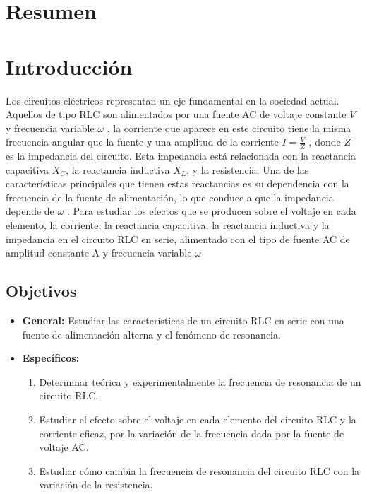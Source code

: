 \documentclass[spanish,notitlepage,letterpaper, 12pt]{article}
\begin{document}

\tableofcontents

\newpage

\section{Resumen}
\section{Introducción}
Los circuitos eléctricos representan un eje fundamental en la sociedad actual. Aquellos de tipo RLC son alimentados por una
fuente AC de voltaje constante $V$ y frecuencia variable $\omega$ , la corriente que
aparece en este circuito tiene la misma frecuencia angular que la fuente y una
amplitud de la corriente $I = \frac{V}{Z}$ , donde $Z$ es la impedancia del circuito. Esta
impedancia está relacionada con la reactancia capacitiva $X_C$, la reactancia
inductiva $X_L$, y la resistencia. Una de las características principales que tienen
estas reactancias es su dependencia con la frecuencia de la fuente de
alimentación, lo que conduce a que la impedancia depende de $\omega$ . Para estudiar
los efectos que se producen sobre el voltaje en cada elemento, la corriente, la
reactancia capacitiva, la reactancia inductiva y la impedancia en el circuito RLC
en serie, alimentado con el tipo de fuente AC de amplitud constante A y frecuencia
variable $\omega$\par
\subsection{Objetivos}
\begin{itemize}
    \item \textbf{General: }Estudiar las características de un circuito RLC en serie con una fuente de
alimentación alterna y el fenómeno de resonancia.
\item \textbf{Específicos: }
    \begin{enumerate}
        \item Determinar teórica y experimentalmente la frecuencia de resonancia de un circuito RLC.
        \item Estudiar el efecto sobre el voltaje en cada elemento del circuito RLC y la
corriente eficaz, por la variación de la frecuencia dada por la fuente de
voltaje AC.
        \item Estudiar cómo cambia la frecuencia de resonancia del circuito RLC con
la variación de la resistencia.
    \end{enumerate}
\end{itemize}
\end{document}

